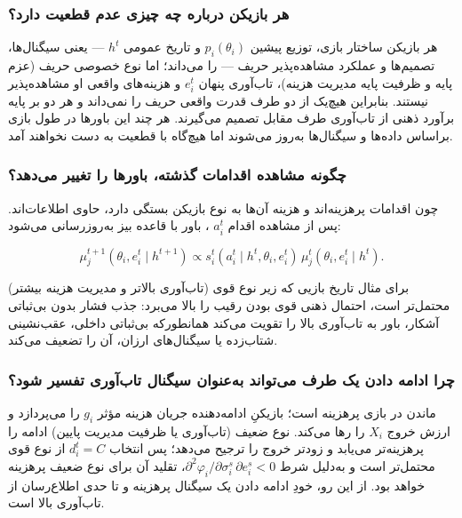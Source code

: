 \documentclass[12pt]{article}
\begin{document}
\subsubsection*{هر بازیکن درباره چه چیزی عدم قطعیت دارد؟}

هر بازیکن ساختار بازی، توزیع پیشین $p_i(\theta_i)$
 و تاریخ عمومی $h^t$
  — یعنی سیگنال‌ها، تصمیم‌ها و عملکرد
   مشاهده‌پذیر حریف  — 
   را می‌داند؛ اما نوع خصوصی حریف 
   (عزم پایه و ظرفیت پایه مدیریت هزینه)، تاب‌آوری پنهان $e_i^t$
    و هزینه‌های واقعی او مشاهده‌پذیر نیستند.
     بنابراین هیچ‌یک از دو طرف قدرت واقعی حریف را نمی‌داند و 
    هر دو بر پایه برآورد ذهنی از تاب‌آوری طرف مقابل تصمیم می‌گیرند.
    هر چند این باورها در طول بازی براساس داده‌ها و سیگنال‌ها به‌روز می‌شوند
    اما هیچ‌گاه با قطعیت به دست نخواهند آمد.

\subsubsection*{چگونه مشاهده اقدامات گذشته، باورها را تغییر می‌دهد؟}

چون اقدامات پرهزینه‌اند
 و هزینه آن‌ها به نوع بازیکن بستگی دارد، حاوی اطلاعات‌اند. پس از مشاهده اقدام $a_i^t$
 ، باور با قاعده بیز به‌روزرسانی می‌شود:

\begin{equation*}
    \mu_j^{t+1}(\theta_i, e_i^t \mid h^{t+1}) \propto
    s_i^t(a_i^t \mid h^t, \theta_i, e_i^t)\, \mu_j^t(\theta_i, e_i^t \mid h^t).
\end{equation*}

برای مثال تاریخ بازیی که زیر نوع قوی 
(تاب‌آوری بالاتر و مدیریت هزینه بیشتر)
محتمل‌تر است، احتمال ذهنی قوی بودن رقیب را بالا می‌برد: 
جذب فشار بدون بی‌ثباتی آشکار، باور به تاب‌آوری بالا را تقویت می‌کند
همانطورکه
  بی‌ثباتی داخلی، عقب‌نشینی شتاب‌زده یا سیگنال‌های ارزان، آن را تضعیف می‌کند.

\subsubsection*{چرا ادامه دادن یک طرف می‌تواند به‌عنوان سیگنال تاب‌آوری تفسیر شود؟}

ماندن در بازی پرهزینه است؛ بازیکنِ ادامه‌دهنده جریان هزینه مؤثر $g_i$
 را می‌پردازد و ارزش خروج $X_i$ 
 را رها می‌کند. نوع ضعیف 
 (تاب‌آوری یا ظرفیت مدیریت پایین) ادامه را پرهزینه‌تر می‌یابد 
 و زودتر خروج را ترجیح می‌دهد؛ پس انتخاب $d_i^t = C$
  از نوع قوی محتمل‌تر است و به‌دلیل شرط 
  $\partial^2 \varphi_i / \partial \sigma_i^s \, \partial e_i^s < 0$،
   تقلید آن برای نوع ضعیف پرهزینه خواهد بود. از این رو، خودِ ادامه
    دادن یک سیگنال پرهزینه و تا حدی اطلاع‌رسان از تاب‌آوری بالا است.
\end{document}
